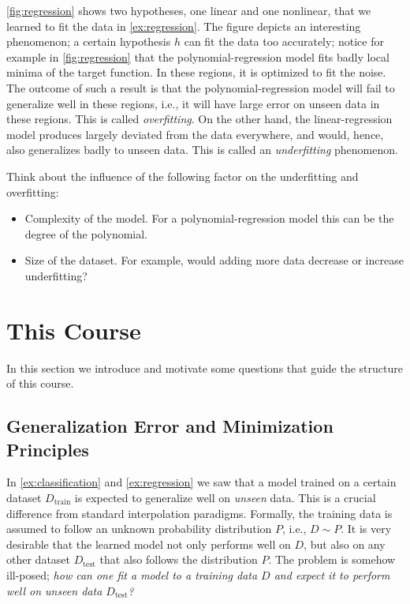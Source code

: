 \autoref{fig:regression} shows two hypotheses, one linear and one nonlinear, that we learned to fit the data in
\autoref{ex:regression}. The figure depicts an interesting phenomenon; a certain
hypothesis $h$ can fit the data too accurately; notice for example in
\autoref{fig:regression} that the polynomial-regression model fits badly local
minima of the target function. In these regions, it is optimized to fit the
noise. The outcome of such a result is that the polynomial-regression model will
fail to generalize well in these regions, i.e., it will have large error on
unseen data in these regions. This is called \emph{overfitting}.
On the other hand, the linear-regression model produces largely deviated from
the data everywhere, and would, hence, also generalizes badly to unseen data.
This is called an \emph{underfitting} phenomenon. 

Think about the influence of the following factor on the underfitting and
overfitting:
\begin{itemize}
    \item Complexity of the model. For a polynomial-regression model this can be
    the degree of the polynomial. 
    \item Size of the dataset. For example, would adding more data decrease or
    increase underfitting?
\end{itemize}


\section{This Course}
In this section we introduce and motivate some questions that guide the
structure of this course.  
\subsection{Generalization Error and Minimization Principles}
In \autoref{ex:classification} and \autoref{ex:regression} we saw that a model
trained on a certain dataset $D_{\text{train}}$ is expected to generalize well on \emph{unseen}
data. This is a crucial difference from standard interpolation paradigms.
Formally, the training data is assumed to follow an unknown probability
distribution $P$, i.e., $D \sim P$. It is very desirable that the learned model
not only performs well on $D$, but also on any other dataset $D_\text{test}$ that
also follows the distribution $P$. The problem is somehow ill-posed; \emph{how can one
fit a model to a training data $D$ and expect it to perform well on unseen data
$D_{\text{test}}$?}

